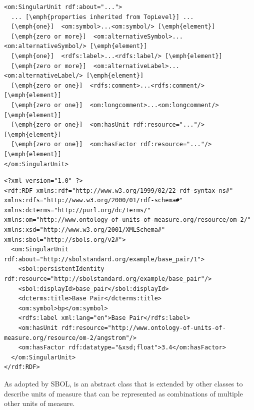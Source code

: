 \begin{lstlisting}
<om:SingularUnit rdf:about="...">
  ... [\emph{properties inherited from TopLevel}] ...
  [\emph{one}]  <om:symbol>...<om:symbol/> [\emph{element}]
  [\emph{zero or more}]  <om:alternativeSymbol>...<om:alternativeSymbol/> [\emph{element}]
  [\emph{one}]  <rdfs:label>...<rdfs:label/> [\emph{element}]
  [\emph{zero or more}]  <om:alternativeLabel>...<om:alternativeLabel/> [\emph{element}]
  [\emph{zero or one}]  <rdfs:comment>...<rdfs:comment/> [\emph{element}]
  [\emph{zero or one}]  <om:longcomment>...<om:longcomment/> [\emph{element}]
  [\emph{zero or one}]  <om:hasUnit rdf:resource="..."/> [\emph{element}]
  [\emph{zero or one}]  <om:hasFactor rdf:resource="..."/> [\emph{element}]
</om:SingularUnit>
\end{lstlisting}

\begin{lstlisting}
<?xml version="1.0" ?>
<rdf:RDF xmlns:rdf="http://www.w3.org/1999/02/22-rdf-syntax-ns#" xmlns:rdfs="http://www.w3.org/2000/01/rdf-schema#" xmlns:dcterms="http://purl.org/dc/terms/" xmlns:om="http://www.ontology-of-units-of-measure.org/resource/om-2/" xmlns:xsd="http://www.w3.org/2001/XMLSchema#" xmlns:sbol="http://sbols.org/v2#">
  <om:SingularUnit rdf:about="http://sbolstandard.org/example/base_pair/1">
    <sbol:persistentIdentity rdf:resource="http://sbolstandard.org/example/base_pair"/>
    <sbol:displayId>base_pair</sbol:displayId>
    <dcterms:title>Base Pair</dcterms:title>
    <om:symbol>bp</om:symbol>
    <rdfs:label xml:lang="en">Base Pair</rdfs:label>
    <om:hasUnit rdf:resource="http://www.ontology-of-units-of-measure.org/resource/om-2/angstrom"/>
    <om:hasFactor rdf:datatype="&xsd;float">3.4</om:hasFactor>
  </om:SingularUnit>
</rdf:RDF>
\end{lstlisting}
\label{ser:SingularUnit}



As adopted by SBOL,  is an abstract class that is extended by other classes to describe units of measure that can be represented as combinations of multiple other units of measure.


